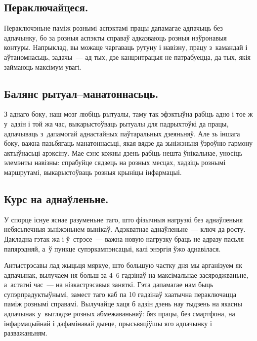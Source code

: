 \subsection*{Пераключайцеся.}

Пераключэньне паміж рознымі аспэктамі працы дапамагае адпачыць без адпачынку, бо за розныя аспэкты справаў адказваюць розныя нэўронавыя контуры. Напрыклад, вы можаце чаргаваць рутуну і навізну, працу з~камандай і аўтаномнасьць, задачы~--- ад тых, дзе канцэнтрацыя не патрабуецца, да тых, якія займаюць максімум увагі.

\subsection*{Балянс рытуал--манатоннасьць.}

З аднаго боку, наш мозг любіць рытуалы, таму так эфэктыўна рабіць адно і тое ж у~адзін і той жа час, выкарыстоўваць рытуалы для падрыхтоўкі да працы, адпачываць з~дапамогай аднастайных паўтаральных дзеяньняў. Але зь іншага боку, важна пазьбягаць манатоннасьці, якая вядзе да зьніжэньня ўзроўню гармону актыўнасьці арэксіну. Мае сэнс кожны дзень рабіць нешта ўнікальнае, уносіць элемэнты навізны: спрабуйце сядзець на розных месцах, хадзіць рознымі маршрутамі, выкарыстоўваць розныя крыніцы інфармацыі.

\subsection*{Курс на аднаўленьне.}

У спорце існуе яснае разуменьне таго, што фізычныя нагрузкі без аднаўленьня небясьпечныя зьніжэньнем вынікаў. Адэкватнае аднаўленьне~--- ключ да росту. Дакладна гэтак жа і ў~стрэсе~--- важна новую нагрузку браць не адразу пасьля папярэдняй, а~ў пункце супэркампэнсацыі, калі энэргія ўжо аднавілася.


Антыстрэсавы лад жыцьця мяркуе, што большую частку дня мы арганізуем як адпачынак, вылучаем ня больш за 4--6 гадзінаў на максімальнае засяроджваньне, а~астатні час~--- на нізкастрэсавыя заняткі. Гэта дапамагае нам быць супэрпрадуктыўнымі, замест таго каб па 10 гадзінаў хаатычна пераключацца паміж рознымі справамі. Вылучайце хаця б адзін дзень нау тыдзень на якасны адпачынак у~выглядзе розных абмежаваньняў: бяз працы, без смартфона, на інфармацыйнай і дафамінавай дыеце, прысьвяціўшы яго адпачынку і разважаньням.

